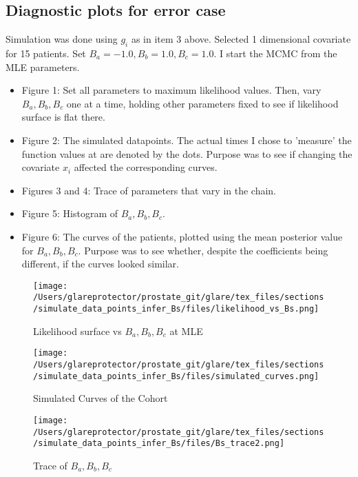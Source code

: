 \subsection*{Diagnostic plots for error case}
Simulation was done using $g_i$ as in item 3 above.  Selected 1 dimensional covariate for 15 patients.  Set $B_a=-1.0, B_b=1.0, B_c=1.0$.  I start the MCMC from the MLE parameters.
\begin{itemize}
\item Figure 1: Set all parameters to maximum likelihood values.  Then, vary $B_a, B_b, B_c$ one at a time, holding other parameters fixed to see if likelihood surface is flat there.
\item Figure 2: The simulated datapoints.  The actual times I chose to 'measure' the function values at are denoted by the dots.  Purpose was to see if changing the covariate $x_i$ affected the corresponding curves.
\item Figures 3 and 4: Trace of parameters that vary in the chain.
\item Figure 5: Histogram of $B_a,B_b,B_c$.
\item Figure 6: The curves of the patients, plotted using the mean posterior value for $B_a, B_b, B_c$.  Purpose was to see whether, despite the coefficients being different, if the curves looked similar.
\end{itemize}

\begin{figure}
\begin{center}
\texttt{[image: /Users/glareprotector/prostate\_git/glare/tex\_files/sections/simulate\_data\_points\_infer\_Bs/files/likelihood\_vs\_Bs.png]}
\caption{Likelihood surface vs $B_a, B_b, B_c$ at MLE}
\end{center}
\end{figure}

\begin{figure}
\begin{center}
\texttt{[image: /Users/glareprotector/prostate\_git/glare/tex\_files/sections/simulate\_data\_points\_infer\_Bs/files/simulated\_curves.png]}
\caption{Simulated Curves of the Cohort}
\end{center}
\end{figure}

\begin{figure}
\begin{center}
\texttt{[image: /Users/glareprotector/prostate\_git/glare/tex\_files/sections/simulate\_data\_points\_infer\_Bs/files/Bs\_trace2.png]}
\caption{Trace of $B_a, B_b, B_c$}
\end{center}
\end{figure}

